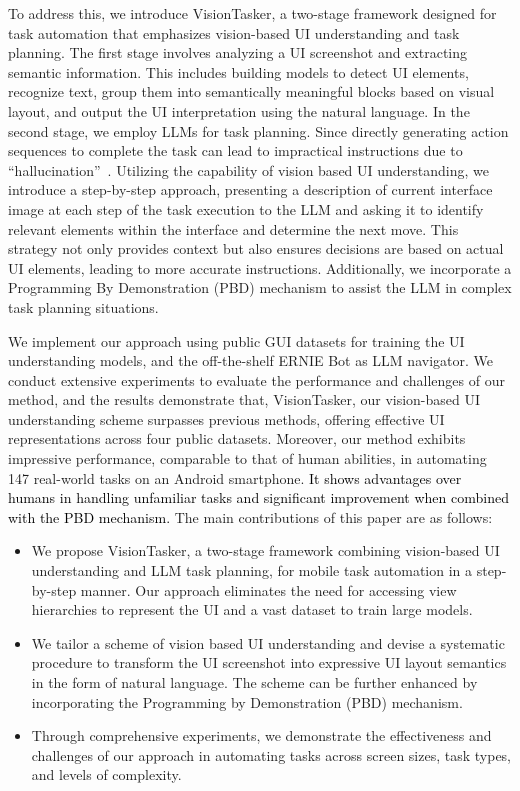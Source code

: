 To address this, we introduce VisionTasker, a two-stage framework designed for task automation that emphasizes vision-based UI understanding and task planning.
The first stage involves analyzing a UI screenshot and extracting semantic information. This includes building models to detect UI elements, recognize text, group them into semantically meaningful blocks based on visual layout, and output the UI interpretation using the natural language. In the second stage, we employ LLMs for task planning. Since directly generating action sequences to complete the task can lead to impractical instructions due to ``hallucination''~\cite{maynez-etal-2020-faithfulness}. Utilizing the capability of vision based UI understanding, we introduce a step-by-step approach, presenting a description of current interface image at each step of the task execution to the LLM and asking it to identify relevant elements within the interface and determine the next move. This strategy not only provides context but also ensures decisions are based on actual UI elements, leading to more accurate instructions. Additionally, we incorporate a Programming By Demonstration (PBD) mechanism to assist the LLM in complex task planning situations.

We implement our approach using public GUI datasets for training the UI understanding models, and the off-the-shelf ERNIE Bot as LLM navigator. We conduct extensive experiments to evaluate the performance and challenges of our method, and the results demonstrate that, VisionTasker, our vision-based UI understanding scheme surpasses previous methods, offering effective UI representations across four public datasets. Moreover, our method exhibits impressive performance, comparable to that of human abilities, in automating 147 real-world tasks on an Android smartphone. \textcolor{black}{It shows advantages over humans in handling unfamiliar tasks and significant improvement when combined with the PBD mechanism.} The main contributions of this paper are as follows:
\begin{itemize}
    \item We propose VisionTasker, a two-stage framework combining vision-based UI understanding and LLM task planning, for mobile task automation in a step-by-step manner. Our approach eliminates the need for accessing view hierarchies to represent the UI and a vast dataset to train large models.
    \item We tailor a scheme of vision based UI understanding and devise a systematic procedure to transform the UI screenshot into expressive UI layout semantics in the form of natural language. The scheme can be further enhanced by incorporating the Programming by Demonstration (PBD) mechanism. 
    \item Through comprehensive experiments, we demonstrate the effectiveness and challenges of our approach in automating tasks across screen sizes, task types, and levels of complexity. 
\end{itemize}

